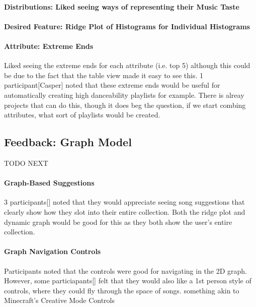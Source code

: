 \paragraph{Distributions: Liked seeing ways of representing their Music Taste}%

\paragraph{Desired Feature: Ridge Plot of Histograms for Individual Histograms}%

\paragraph{Attribute: Extreme Ends}%
Liked seeing the extreme ends for each attribute (i.e. top 5) although this could be due to the fact that the table view made it easy to see this.
1 participant[Casper] noted that these extreme ends would be useful for automatically creating high danceability playlists for example. There is alreay projects that can do this, though it does beg the question, if we start combing attributes, what sort of playlists would be created. %

\subsection{Feedback: Graph Model}
TODO NEXT

\paragraph{Graph-Based Suggestions}
3 participants[] noted that they would appreciate seeing song suggestions that clearly show how they slot into their entire collection. Both the ridge plot and dynamic graph would be good for this as they both show the user's entire collection.

\paragraph{Graph Navigation Controls}
Participants noted that the controls were good for navigating in the 2D graph. However, some particiapants[] felt that they would also like a 1st person style of controls, where they could fly through the space of songs. something akin to Minecraft's Creative Mode Controls

